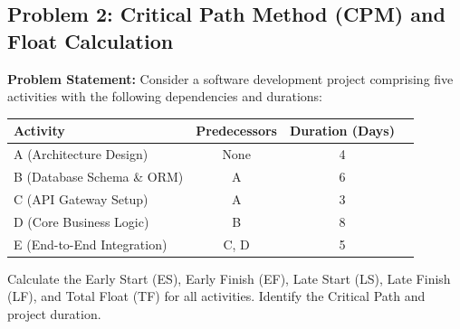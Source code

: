 \subsection*{Problem 2: Critical Path Method (CPM) and Float Calculation}
\textbf{Problem Statement:} Consider a software development project comprising five activities with the following dependencies and durations:
\begin{center}
\small
\begin{tabular}{lccc}
\toprule
\textbf{Activity} & \textbf{Predecessors} & \textbf{Duration (Days)} \\
\midrule
A (Architecture Design) & None & 4 \\
B (Database Schema \& ORM) & A & 6 \\
C (API Gateway Setup) & A & 3 \\
D (Core Business Logic) & B & 8 \\
E (End-to-End Integration) & C, D & 5 \\
\bottomrule
\end{tabular}
\end{center}
Calculate the Early Start (ES), Early Finish (EF), Late Start (LS), Late Finish (LF), and Total Float (TF) for all activities. Identify the Critical Path and project duration.

